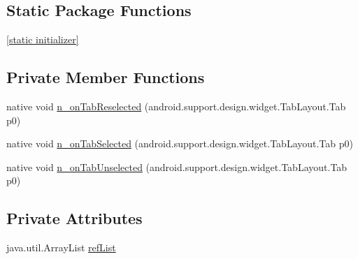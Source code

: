 \subsection*{Static Package Functions}
\begin{CompactItemize}
\item 
\hyperlink{classmono_1_1android_1_1support_1_1design_1_1widget_1_1_tab_layout___on_tab_selected_listener_implementor_ba7a1c321262e74ef9f57a902f76ee48}{\mbox{[}static initializer\mbox{]}}
\end{CompactItemize}
\subsection*{Private Member Functions}
\begin{CompactItemize}
\item 
native void \hyperlink{classmono_1_1android_1_1support_1_1design_1_1widget_1_1_tab_layout___on_tab_selected_listener_implementor_c18eb505a0d94b91fdf29e1854630ce3}{n\_\-onTabReselected} (android.support.design.widget.TabLayout.Tab p0)
\item 
native void \hyperlink{classmono_1_1android_1_1support_1_1design_1_1widget_1_1_tab_layout___on_tab_selected_listener_implementor_b714061ffdc62192ab6c46f25ef81e04}{n\_\-onTabSelected} (android.support.design.widget.TabLayout.Tab p0)
\item 
native void \hyperlink{classmono_1_1android_1_1support_1_1design_1_1widget_1_1_tab_layout___on_tab_selected_listener_implementor_97a237b665a078df5a07f80a61c3b4e5}{n\_\-onTabUnselected} (android.support.design.widget.TabLayout.Tab p0)
\end{CompactItemize}
\subsection*{Private Attributes}
\begin{CompactItemize}
\item 
java.util.ArrayList \hyperlink{classmono_1_1android_1_1support_1_1design_1_1widget_1_1_tab_layout___on_tab_selected_listener_implementor_bc416c9b976f6bc6214e2d2f1c8edac7}{refList}
\end{CompactItemize}


